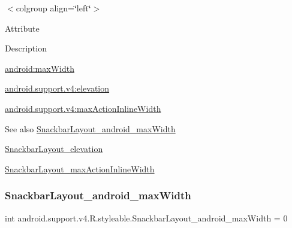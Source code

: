 \tabulinesep=1mm
\begin{longtabu} spread 0pt [c]{*{0}{|X[-1]}|}
\hline
\end{longtabu}
$<$colgroup align=\char`\"{}left\char`\"{}$>$ 

Attribute

Description 

{\ttfamily \hyperlink{classandroid_1_1support_1_1v4_1_1R_1_1styleable_abe4e77c7120a352ab90118f7d7aaab2f}{android\+:max\+Width}}

{\ttfamily \hyperlink{classandroid_1_1support_1_1v4_1_1R_1_1styleable_a6de1ff1662bd8a8c27b3cbf7f2e42cd1}{android.\+support.\+v4\+:elevation}}

{\ttfamily \hyperlink{classandroid_1_1support_1_1v4_1_1R_1_1styleable_aeb129833e9a42db9f72110a798421a5f}{android.\+support.\+v4\+:max\+Action\+Inline\+Width}}

\begin{DoxySeeAlso}{See also}
\hyperlink{classandroid_1_1support_1_1v4_1_1R_1_1styleable_abe4e77c7120a352ab90118f7d7aaab2f}{Snackbar\+Layout\+\_\+android\+\_\+max\+Width} 

\hyperlink{classandroid_1_1support_1_1v4_1_1R_1_1styleable_a6de1ff1662bd8a8c27b3cbf7f2e42cd1}{Snackbar\+Layout\+\_\+elevation} 

\hyperlink{classandroid_1_1support_1_1v4_1_1R_1_1styleable_aeb129833e9a42db9f72110a798421a5f}{Snackbar\+Layout\+\_\+max\+Action\+Inline\+Width} 
\end{DoxySeeAlso}
\mbox{\label{classandroid_1_1support_1_1v4_1_1R_1_1styleable_abe4e77c7120a352ab90118f7d7aaab2f}} 
\subsubsection{\texorpdfstring{Snackbar\+Layout\+\_\+android\+\_\+max\+Width}{SnackbarLayout\_android\_maxWidth}}
{\footnotesize\ttfamily int android.\+support.\+v4.\+R.\+styleable.\+Snackbar\+Layout\+\_\+android\+\_\+max\+Width = 0\hspace{0.3cm}{\ttfamily [static]}}

